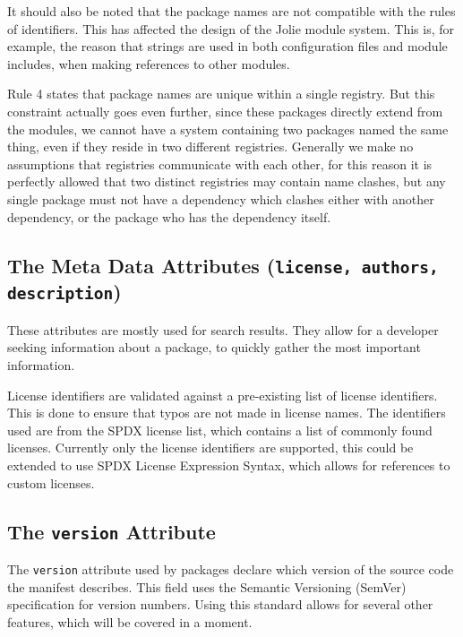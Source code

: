 It should also be noted that the package names are not compatible with the
rules of identifiers. This has affected the design of the Jolie module system.
This is, for example, the reason that strings are used in both configuration
files and module includes, when making references to other modules.

Rule 4 states that package names are unique within a single registry. But this
constraint actually goes even further, since these packages directly extend
from the modules, we cannot have a system containing two packages named the
same thing, even if they reside in two different registries. Generally we make
no assumptions that registries communicate with each other, for this reason it
is perfectly allowed that two distinct registries may contain name clashes, but
any single package must not have a dependency which clashes either with another
dependency, or the package who has the dependency itself.

\subsection{The Meta Data Attributes ({\tt license, authors, description})}

These attributes are mostly used for search results. They allow for a developer
seeking information about a package, to quickly gather the most important
information.

License identifiers are validated against a pre-existing list of license
identifiers. This is done to ensure that typos are not made in license names.
The identifiers used are from the SPDX license list, which contains a list of
commonly found licenses. Currently only the license identifiers are supported,
this could be extended to use SPDX License Expression Syntax, which allows for
references to custom licenses.

\subsection{The {\tt version} Attribute}


The \texttt{version} attribute used by packages declare which version
of the source code the manifest describes. This field uses the Semantic
Versioning (SemVer) specification for version numbers. Using this standard
allows for several other features, which will be covered in a moment.

